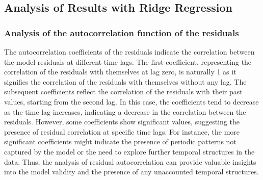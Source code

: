 \documentclass[10pt]{article} %
\begin{document}
    \subsection{Analysis of Results with Ridge Regression}

    \subsubsection{Analysis of the autocorrelation function of the residuals}
    The autocorrelation coefficients of the residuals indicate the correlation between the model residuals at different time lags. The first coefficient, representing the correlation of the residuals with themselves at lag zero, is naturally 1 as it signifies the correlation of the residuals with themselves without any lag. The subsequent coefficients reflect the correlation of the residuals with their past values, starting from the second lag. In this case, the coefficients tend to decrease as the time lag increases, indicating a decrease in the correlation between the residuals. However, some coefficients show significant values, suggesting the presence of residual correlation at specific time lags. For instance, the more significant coefficients might indicate the presence of periodic patterns not captured by the model or the need to explore further temporal structures in the data. Thus, the analysis of residual autocorrelation can provide valuable insights into the model validity and the presence of any unaccounted temporal structures.


 
\end{document}
